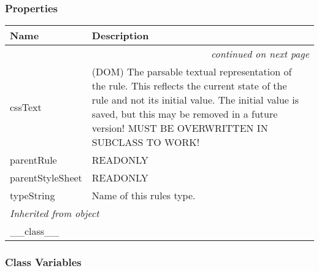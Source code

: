
  \subsubsection{Properties}

    \vspace{-1cm}
\hspace{\varindent}\begin{longtable}{|p{\varnamewidth}|p{\vardescrwidth}|l}
\cline{1-2}
\cline{1-2} \centering \textbf{Name} & \centering \textbf{Description}& \\
\cline{1-2}
\endhead\cline{1-2}\multicolumn{3}{r}{\small\textit{continued on next page}}\\\endfoot\cline{1-2}
\endlastfoot\raggedright c\-s\-s\-T\-e\-x\-t\- & \raggedright (DOM) The parsable textual representation of the rule. This
reflects the current state of the rule and not its initial value.
The initial value is saved, but this may be removed in a future
version!
MUST BE OVERWRITTEN IN SUBCLASS TO WORK!&\\
\cline{1-2}
\raggedright p\-a\-r\-e\-n\-t\-R\-u\-l\-e\- & \raggedright READONLY&\\
\cline{1-2}
\raggedright p\-a\-r\-e\-n\-t\-S\-t\-y\-l\-e\-S\-h\-e\-e\-t\- & \raggedright READONLY&\\
\cline{1-2}
\raggedright t\-y\-p\-e\-S\-t\-r\-i\-n\-g\- & \raggedright Name of this rules type.&\\
\cline{1-2}
\multicolumn{2}{|l|}{\textit{Inherited from object}}\\
\multicolumn{2}{|p{\varwidth}|}{\raggedright \_\_class\_\_}\\
\cline{1-2}
\end{longtable}



  \subsubsection{Class Variables}

